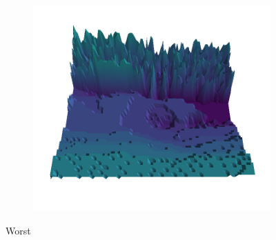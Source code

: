 \documentclass[../document.tex]{subfiles}
\begin{document}
\begin{figure}[H]
    \begin{subfigure}[b]{0.19\textwidth}
        \includegraphics[width=\linewidth]{../img/5/quarry/worst//patch-3d-majavi-colormap-4.png}
    \end{subfigure}  

\caption{Worst}    
\end{figure}
\end{document}
